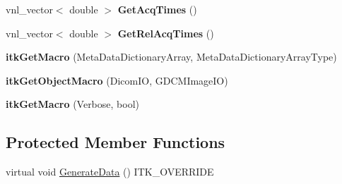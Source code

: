 \begin{DoxyCompactItemize}
\item 
\hypertarget{classitk_1_1_read_file_list_filter_a8e14dae219792a15c4cc2d999939c857}{vnl\-\_\-vector$<$ double $>$ {\bfseries Get\-Acq\-Times} ()}\label{classitk_1_1_read_file_list_filter_a8e14dae219792a15c4cc2d999939c857}

\item 
\hypertarget{classitk_1_1_read_file_list_filter_a47b0dfdacabc55a82f0e6f7dc178202d}{vnl\-\_\-vector$<$ double $>$ {\bfseries Get\-Rel\-Acq\-Times} ()}\label{classitk_1_1_read_file_list_filter_a47b0dfdacabc55a82f0e6f7dc178202d}

\item 
\hypertarget{classitk_1_1_read_file_list_filter_a32295d5af664bf317256fd05b5eecf58}{{\bfseries itk\-Get\-Macro} (Meta\-Data\-Dictionary\-Array, Meta\-Data\-Dictionary\-Array\-Type)}\label{classitk_1_1_read_file_list_filter_a32295d5af664bf317256fd05b5eecf58}

\item 
\hypertarget{classitk_1_1_read_file_list_filter_a5af949d7c4a38361e5a71a708973f0d1}{{\bfseries itk\-Get\-Object\-Macro} (Dicom\-I\-O, G\-D\-C\-M\-Image\-I\-O)}\label{classitk_1_1_read_file_list_filter_a5af949d7c4a38361e5a71a708973f0d1}

\item 
\hypertarget{classitk_1_1_read_file_list_filter_adfede0436d3a13a3dd46eae7fdc4a3d7}{{\bfseries itk\-Get\-Macro} (Verbose, bool)}\label{classitk_1_1_read_file_list_filter_adfede0436d3a13a3dd46eae7fdc4a3d7}

\end{DoxyCompactItemize}
\subsection*{Protected Member Functions}
\begin{DoxyCompactItemize}
\item 
virtual void \hyperlink{classitk_1_1_read_file_list_filter_a5f8f919179a942af4db31a28276a317e}{Generate\-Data} () I\-T\-K\-\_\-\-O\-V\-E\-R\-R\-I\-D\-E
\end{DoxyCompactItemize}


